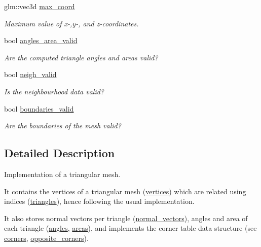 \begin{DoxyCompactItemize}
\mbox{\label{classgeoproc_1_1TriangleMesh_ae51ba387921e2be00c7608a73ea7498c}} 
glm\+::vec3d \hyperlink{classgeoproc_1_1TriangleMesh_ae51ba387921e2be00c7608a73ea7498c}{max\+\_\+coord}
\begin{DoxyCompactList}\small\item\em Maximum value of x-\/,y-\/, and z-\/coordinates. \end{DoxyCompactList}\item 
\mbox{\label{classgeoproc_1_1TriangleMesh_a046a6679ae404e02ae40d4d4d798b6f6}} 
bool \hyperlink{classgeoproc_1_1TriangleMesh_a046a6679ae404e02ae40d4d4d798b6f6}{angles\+\_\+area\+\_\+valid}
\begin{DoxyCompactList}\small\item\em Are the computed triangle angles and areas valid? \end{DoxyCompactList}\item 
bool \hyperlink{classgeoproc_1_1TriangleMesh_a21205ec88e494f864db4d8247db70d3c}{neigh\+\_\+valid}
\begin{DoxyCompactList}\small\item\em Is the neighbourhood data valid? \end{DoxyCompactList}\item 
bool \hyperlink{classgeoproc_1_1TriangleMesh_a1384fa834aaa4ec3dc7c3b025b1ca528}{boundaries\+\_\+valid}
\begin{DoxyCompactList}\small\item\em Are the boundaries of the mesh valid? \end{DoxyCompactList}\end{DoxyCompactItemize}


\subsection{Detailed Description}
Implementation of a triangular mesh. 

It contains the vertices of a triangular mesh (\hyperlink{classgeoproc_1_1TriangleMesh_a72052fc497d349c48966b937e5e3e834}{vertices}) which are related using indices (\hyperlink{classgeoproc_1_1TriangleMesh_ad1cf20622f2bb080100862f413bd89c2}{triangles}), hence following the usual implementation.

It also stores normal vectors per triangle (\hyperlink{classgeoproc_1_1TriangleMesh_a9fa270e81bcf0b9acf03696d9d0c9264}{normal\+\_\+vectors}), angles and area of each triangle (\hyperlink{classgeoproc_1_1TriangleMesh_a50b5456f546551aa39d68487614d7720}{angles}, \hyperlink{classgeoproc_1_1TriangleMesh_a134859a7251c2ae7c8b64b2e44e8ad0e}{areas}), and implements the corner table data structure (see \hyperlink{classgeoproc_1_1TriangleMesh_ab9610d614e081deb28010d237fecd55b}{corners}, \hyperlink{classgeoproc_1_1TriangleMesh_a2604795c90c694116513252b86d242b4}{opposite\+\_\+corners}).

